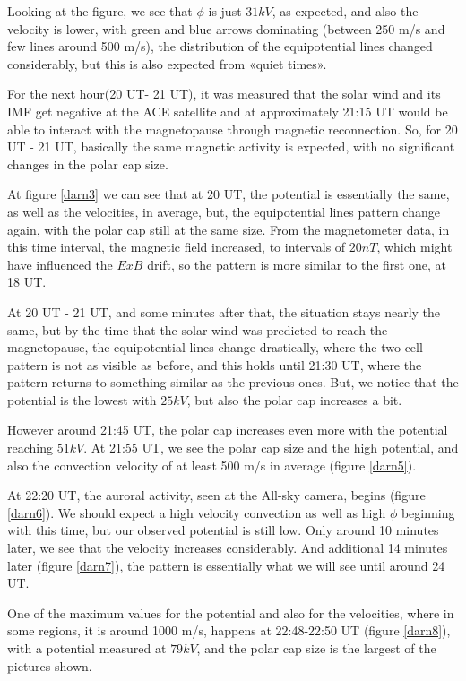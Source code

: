\documentclass[10pt,a4paper]{article}
\begin{document}
Looking at the figure, we see that $\phi$ is just $31 kV$, as expected, and also  the velocity is lower, with green and blue arrows dominating (between 250 m/s and few lines around 500 m/s), the distribution of the equipotential lines changed considerably, but this is also expected from «quiet times».

For the next hour(20 UT- 21 UT), it was measured that the solar wind and its IMF get negative at the ACE satellite and at approximately 21:15 UT would be able to interact with the magnetopause through magnetic reconnection. So, for 20 UT - 21 UT, basically the same magnetic activity is expected, with no significant changes in the polar cap size.

At figure \ref{darn3} we can see that at 20 UT, the potential is essentially the same, as well as the velocities, in average, but, the equipotential lines pattern change again, with the polar cap still at the same size. From the magnetometer data, in this time interval, the magnetic field increased, to intervals of $20 nT$, which might have influenced the $E x B$ drift, so the pattern is more similar to the first one, at 18 UT.


At 20 UT - 21 UT, and some minutes after that, the situation stays nearly the same, but by the time that the solar wind was predicted to reach the magnetopause, the equipotential lines change drastically, where the two cell pattern is not as visible as before, and this holds until 21:30 UT, where the pattern returns to something similar as the previous ones. But, we notice that the potential is the lowest with $25kV$, but also the polar cap increases a bit.

However around 21:45 UT, the polar cap increases even more with the potential reaching $51 kV$. At 21:55 UT, we see the polar cap size and the high potential, and also the convection velocity of at least 500 m/s in average (figure \ref{darn5}).

At 22:20 UT, the auroral activity, seen at the All-sky camera, begins (figure \ref{darn6}). We should expect a high velocity convection as well as high $\phi$ beginning with this time, but our observed potential is still low. Only around 10 minutes later, we see that the velocity increases considerably.  And additional 14 minutes later (figure \ref{darn7}), the pattern is essentially what we will see until around 24 UT.

One of the maximum values for the potential and also for the velocities, where in some regions, it is  around 1000 m/s, happens at 22:48-22:50 UT (figure \ref{darn8}), with a potential measured at $79 kV$, and the polar cap size is the largest of the pictures shown.
\end{document}
